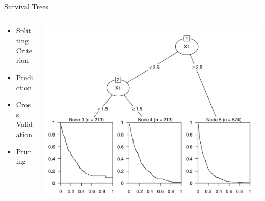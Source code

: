 \documentclass{beamer}
\begin{document}
\begin{frame}{Survival Trees}
\begin{columns}
    \begin{column}{.49\textwidth}
    \begin{itemize}
    \item Splitting Criterion
    \item Prediction
    \item Cross Validation
    \item Pruning
    \end{itemize}
    \cite{SafavianLandgrebe}
    \end{column}
    \begin{column}{.49\textwidth}
    \centering
    \includegraphics[width = \textwidth]{images/st.png}
    \end{column}
\end{columns}

\end{frame}
\end{document}
